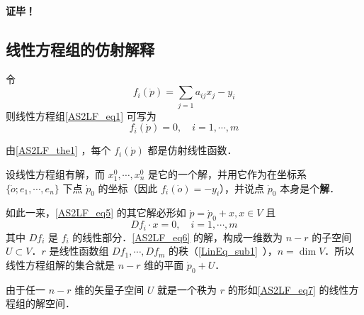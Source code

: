 \textbf{证毕！}
\subsection{线性方程组的仿射解释}
令
\begin{equation}\label{AS2LF_eq7}
f_i(\dot p)=\sum_{j=1}a_{ij}x_j-y_i
\end{equation}
则线性方程组\autoref{AS2LF_eq1} 可写为
\begin{equation}\label{AS2LF_eq5}
f_i(\dot p)=0,\quad i=1,\cdots,m
\end{equation}

由\autoref{AS2LF_the1} ，每个 $f_i(\dot p)$ 都是仿射线性函数．

设线性方程组有解，而 $x_1^0,\cdots,x_n^0$ 是它的一个解，并用它作为在坐标系 $\{\dot o;e_1,\cdots,e_n\}$ 下点 $\dot p_0$ 的坐标（因此 $f_i(\dot o)=-y_i$），并说点 $\dot p_0$ 本身是个\textbf{解}．

如此一来，\autoref{AS2LF_eq5} 的其它解必形如 $\dot p=\dot p_0+x, x\in V$ 且
\begin{equation}\label{AS2LF_eq6}
 Df_i \cdot x=0,\quad i=1,\cdots,m
\end{equation}
其中 $Df_i$ 是 $f_i$ 的线性部分．\autoref{AS2LF_eq6} 的解，构成一维数为 $n-r$ 的子空间 $U\subset V$．$r$ 是线性函数组 $Df_1,\cdots,Df_m$ 的秩（\autoref{LinEq_sub1}~），$n=\dim V$．所以线性方程组解的集合就是 $n-r$ 维的平面 $\dot p_0+U$．

由于任一 $n-r$ 维的矢量子空间 $U$ 就是一个秩为 $r$ 的形如\autoref{AS2LF_eq7}  的线性方程组的解空间．